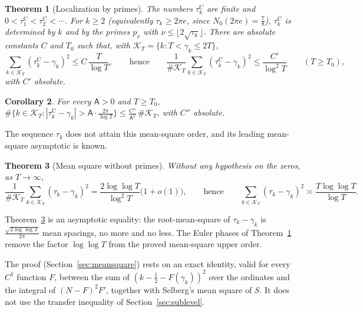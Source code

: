 \documentclass[11pt,a4paper]{article}
\makeatletter
\numberwithin{equation}{section}
\DeclareRobustCommand{\CGref}[1]{\ref{#1}}
\let\CG@origref\ref
\newcommand{\CG@gettip}[1]{\@ifundefined{CGTip@#1}{#1}{\csname CGTip@#1\endcsname}}
\DeclareRobustCommand{\CGref}[1]{\pdftooltip{\CG@origref{#1}}{\CG@gettip{#1}}}
\newtheorem{theorem}{Theorem}[section]
\newtheorem{corollary}[theorem]{Corollary}
\theoremstyle{definition}
\theoremstyle{remark}
\newcommand{\Nz}{N_0} %
\newcommand{\Kc}{\mathcal K}
\makeatother
\begin{document}
\begin{theorem}[Localization by primes]\label{thm:sublevel}
The numbers $\tau_{k}^{\mathrm C}$ are finite and $0<\tau_{1}^{\mathrm C}<\tau_{2}^{\mathrm C}<\cdots$. For $k\ge2$ (equivalently $\tau_k\ge2\pi e$, since $\Nz(2\pi e)=\frac78$), $\tau_{k}^{\mathrm C}$ is determined by $k$ and by the primes $p_\nu$ with $\nu\le\lfloor2\sqrt{\tau_k}\rfloor$. There are absolute constants $C$ and $T_0$ such that, with $\Kc_T=\{k:T<\gamma_k\le2T\}$,
\begin{equation}
\sum_{k\in\Kc_T}(\tau_{k}^{\mathrm C}-\gamma_k)^2\le C\,\frac T{\log T},\qquad\text{hence}\qquad \frac1{\#\Kc_T}\sum_{k\in\Kc_T}(\tau_{k}^{\mathrm C}-\gamma_k)^2\le\frac{C'}{\log^2T}\qquad(T\ge T_0),
\label{eq:main_sublevel}
\end{equation}
with $C'$ absolute.
\end{theorem}

\begin{corollary}\label{cor:proportion}
For every $\mathsf A>0$ and $T\ge T_0$, $\#\{k\in\Kc_T:|\tau_{k}^{\mathrm C}-\gamma_k|>\mathsf A\cdot\frac{2\pi}{\log T}\}\le\frac{C''}{\mathsf A^2}\,\#\Kc_T$, with $C''$ absolute.
\end{corollary}

The sequence $\tau_k$ does not attain this mean-square order, and its leading mean-square asymptotic is known.

\begin{theorem}[Mean square without primes]\label{thm:meansquare}
Without any hypothesis on the zeros, as $T\to\infty$,
\begin{equation}
\frac1{\#\Kc_T}\sum_{k\in\Kc_T}(\tau_k-\gamma_k)^2=\frac{2\log\log T}{\log^2T}\bigl(1+o(1)\bigr),\qquad\text{hence}\qquad \sum_{k\in\Kc_T}(\tau_k-\gamma_k)^2\asymp\frac{T\log\log T}{\log T}.
\label{eq:meansquare}
\end{equation}
\end{theorem}

Theorem~\CGref{thm:meansquare} is an asymptotic equality: the root-mean-square of $\tau_k-\gamma_k$ is $\frac{\sqrt{2\log\log T}}{2\pi}$ mean spacings, no more and no less. The Euler phases of Theorem~\CGref{thm:sublevel} remove the factor $\log\log T$ from the proved mean-square upper order. \par
The proof (Section~\CGref{sec:meansquare}) rests on an exact identity, valid for every $C^1$ function $F$, between the sum of $(k-\frac12-F(\gamma_k))^2$ over the ordinates and the integral of $(N-F)^2F'$, together with Selberg's mean square of $S$. It does not use the transfer inequality of Section~\CGref{sec:sublevel}.
\end{document}
